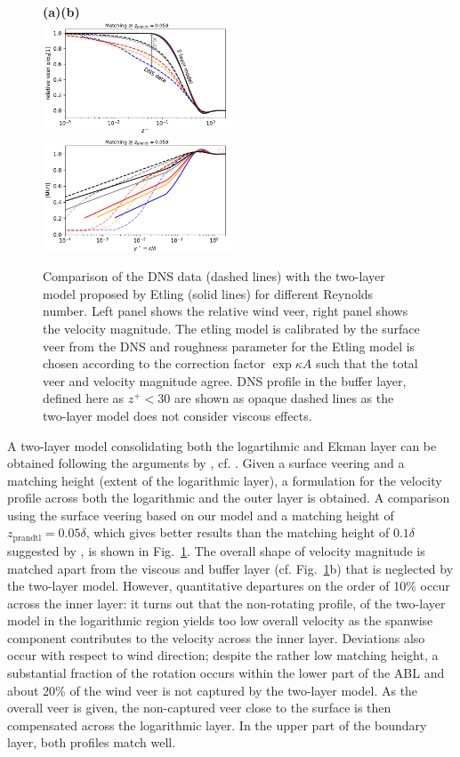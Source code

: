 \documentclass[smallcondensed,final]{svjour3}
\begin{document}
\begin{figure}
  \textbf{(a)\hspace{0.48\textwidth}(b)}\\
  \includegraphics[width=0.5\textwidth]{../plot/etling_direction_1.pdf} 
  \includegraphics[width=0.5\textwidth]{../plot/etling_magnitude_1.pdf}
  \caption{Comparison of the DNS data (dashed lines) with the two-layer model proposed by Etling (solid lines) for different Reynolds number. Left panel shows the relative wind veer, right panel shows the velocity magnitude. The etling model is calibrated by the surface veer from the DNS and roughness parameter for the Etling model is chosen according to the correction factor $\exp{\kappa A}$ such that the total veer and velocity magnitude agree. DNS profile in the buffer layer, defined here as $z^+<30$ are shown as opaque dashed lines as the two-layer model does not consider viscous effects.}
  \label{fig:etling} 
\end{figure}A two-layer model consolidating both the logartihmic and Ekman layer can be obtained following the arguments by \cite{etling:2008}, cf. \cite{emeis:2018}. Given a surface veering and a matching height (extent of the logarithmic layer), a formulation for the velocity profile across both the logarithmic and the outer layer is obtained. A comparison using the surface veering based on our model and a matching height of $z_\text{prandtl}=0.05\delta$, which gives better results than the matching height of $0.1\delta$ suggested by \cite{etling:2008}, is shown in Fig.~\ref{fig:etling}. 
% 
The overall shape of velocity magnitude is matched apart from the viscous and buffer layer (cf. Fig.~\ref{fig:etling}b) that is neglected by the two-layer model. However, quantitative departures on the order of 10\% occur across the inner layer: it turns out that the non-rotating profile, of the two-layer model in the logarithmic region yields too low overall velocity as the spanwise component contributes to the velocity across the inner layer. 
% 
Deviations also occur with respect to wind direction; despite the rather low matching height, a substantial fraction of the rotation occurs within the lower part of the ABL and about 20\% of the wind veer is not captured by the two-layer model. 
% 
As the overall veer is given, the non-captured veer close to the surface is then compensated across the logarithmic layer. In the upper part of the boundary layer, both profiles match well. 
% 
\end{document}
